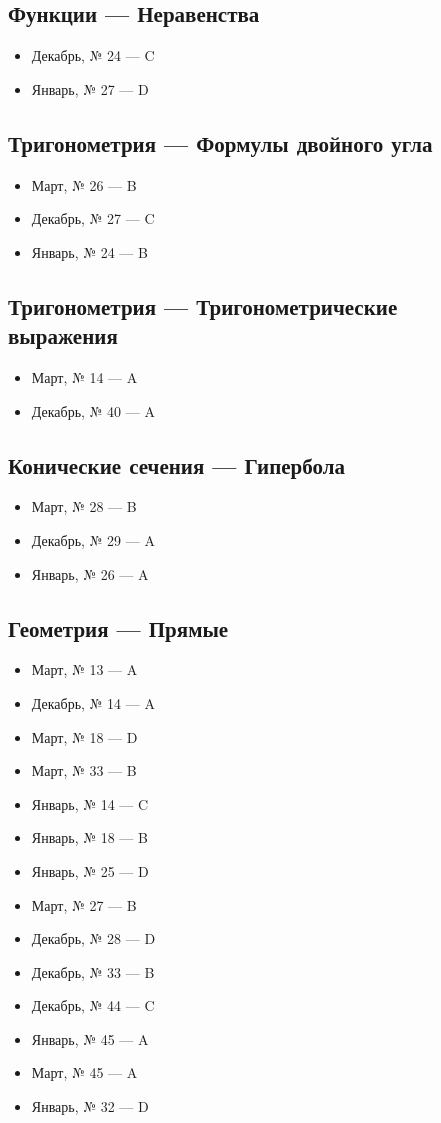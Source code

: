 \subsection*{Функции — Неравенства}
\begin{itemize}
\item Декабрь, № 24 — C
\item Январь, № 27 — D
\end{itemize}

\subsection*{Тригонометрия — Формулы двойного угла}
\begin{itemize}
\item Март, № 26 — B
\item Декабрь, № 27 — C
\item Январь, № 24 — B
\end{itemize}

\subsection*{Тригонометрия — Тригонометрические выражения}
\begin{itemize}
\item Март, № 14 — A
\item Декабрь, № 40 — A
\end{itemize}

\subsection*{Конические сечения — Гипербола}
\begin{itemize}
\item Март, № 28 — B
\item Декабрь, № 29 — A
\item Январь, № 26 — A
\end{itemize}

\subsection*{Геометрия — Прямые}
\begin{itemize}
\item Март, № 13 — A
\item Декабрь, № 14 — A
\item Март, № 18 — D
\item Март, № 33 — B
\item Январь, № 14 — C
\item Январь, № 18 — B
\item Январь, № 25 — D
\item Март, № 27 — B
\item Декабрь, № 28 — D
\item Декабрь, № 33 — B
\item Декабрь, № 44 — C
\item Январь, № 45 — A
\item Март, № 45 — A
\item Январь, № 32 — D
\end{itemize}

